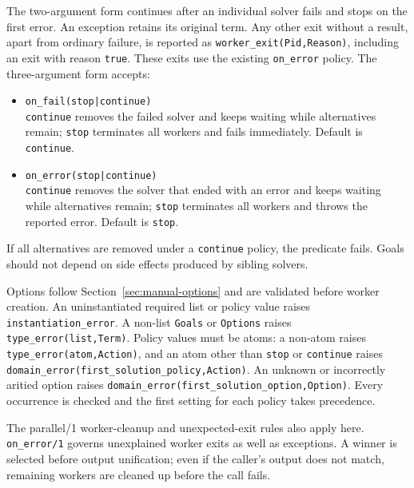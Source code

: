 The two-argument form continues after an individual solver fails and stops
on the first error. An exception retains its original term. Any other exit
without a result, apart from ordinary failure, is reported as
\texttt{worker\_\allowbreak{}exit(\allowbreak{}Pid,\allowbreak{}Reason)}, including an exit with reason
\texttt{true}. These exits use the existing \texttt{on\_\allowbreak{}error} policy.
The three-argument form accepts:

\begin{itemize}
\item
  \texttt{on\_\allowbreak{}fail(\allowbreak{}stop|continue)}\\
  \texttt{continue} removes the failed solver and keeps waiting while
  alternatives remain; \texttt{stop} terminates all workers and fails
  immediately. Default is \texttt{continue}.
\item
  \texttt{on\_\allowbreak{}error(\allowbreak{}stop|continue)}\\
  \texttt{continue} removes the solver that ended with an error and keeps
  waiting while alternatives remain; \texttt{stop} terminates all workers
  and throws the reported error. Default is \texttt{stop}.
\end{itemize}

\noindent If all alternatives are removed under a \texttt{continue} policy,
the predicate fails. Goals should not depend on side effects produced by
sibling solvers.

Options follow Section~\ref{sec:manual-options} and are validated before
worker creation. An uninstantiated required list or policy value raises
\texttt{instantiation\_error}. A non-list \texttt{Goals} or \texttt{Options}
raises \texttt{type\_\allowbreak{}error(\allowbreak{}list,\allowbreak{}Term)}.
Policy values must be atoms: a non-atom raises
\texttt{type\_\allowbreak{}error(\allowbreak{}atom,\allowbreak{}Action)}, and
an atom other than \texttt{stop} or \texttt{continue} raises
\texttt{domain\_\allowbreak{}error(\allowbreak{}first\_\allowbreak{}solution\_\allowbreak{}policy,\allowbreak{}Action)}.
An unknown or incorrectly aritied option raises
\texttt{domain\_\allowbreak{}error(\allowbreak{}first\_\allowbreak{}solution\_\allowbreak{}option,\allowbreak{}Option)}.
Every occurrence is checked and the first setting for each policy takes precedence.

The parallel/1 worker-cleanup and unexpected-exit rules also apply here. \texttt{on\_\allowbreak{}error/\allowbreak{}1}
governs unexplained worker exits as well as exceptions. A winner is selected before output
unification; even if the caller's output does not match, remaining workers are cleaned up before the
call fails.

